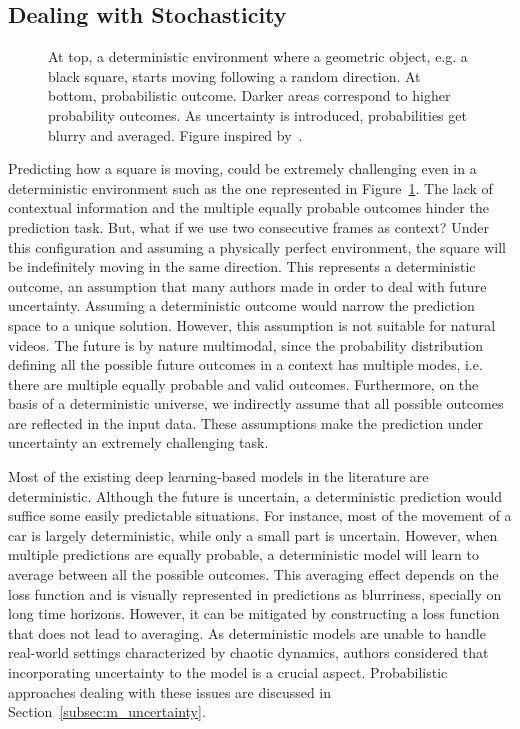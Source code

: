 \subsection{Dealing with Stochasticity}
\begin{figure}
	\centering
	\resizebox{0.8\textwidth}{!}{
		
	}
	\caption{At top, a deterministic environment where a geometric object, e.g. a black square, starts moving following a random direction. At bottom, probabilistic outcome. Darker areas correspond to higher probability outcomes. As uncertainty is introduced, probabilities get blurry and averaged. Figure inspired by~\cite{Babaeizadeh2018}.}
	\label{fig:deterministic}
\end{figure}
Predicting how a square is moving, could be extremely challenging even in a deterministic environment such as the one represented in Figure~\ref{fig:deterministic}. The lack of contextual information and the multiple equally probable outcomes hinder the prediction task. But, what if we use two consecutive frames as context? Under this configuration and assuming a physically perfect environment, the square will be indefinitely moving in the same direction. This represents a deterministic outcome, an assumption that many authors made in order to deal with future uncertainty. Assuming a deterministic outcome would narrow the prediction space to a unique solution. However, this assumption is not suitable for natural videos. The future is by nature multimodal, 
since the probability distribution defining all the possible future outcomes in a context has multiple modes, i.e. there are multiple equally probable and valid outcomes. Furthermore, on the basis of a deterministic universe, we indirectly assume that all possible outcomes are reflected in the input data. These assumptions make the prediction under uncertainty an extremely challenging task. 

Most of the existing deep learning-based models in the literature are deterministic. Although the future is uncertain, a deterministic prediction would suffice some easily predictable situations. For instance, most of the movement of a car is largely deterministic, while only a small part is uncertain. However, when multiple predictions are equally probable, a deterministic model will learn to average between all the possible outcomes. This averaging effect depends on the loss function and is visually represented in predictions as blurriness, specially on long time horizons. However, it can be mitigated by constructing a loss function that does not lead to averaging. As deterministic models are unable to handle real-world settings characterized by chaotic dynamics, authors considered that incorporating uncertainty to the model is a crucial aspect. Probabilistic approaches dealing with these issues are discussed in Section~\ref{subsec:m_uncertainty}.

